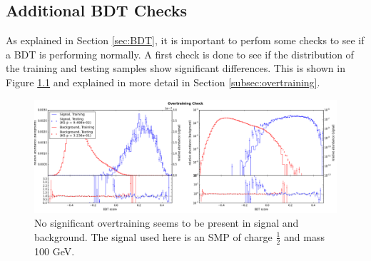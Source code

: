 \begin{appendices}
\usechapterimagefalse
{}
\chapter{Additional BDT Checks}
\label{ch:bdtchecks}
\usechapterimagetrue
As explained in Section \ref{sec:BDT}, it is important to perfom some checks to see if a BDT is performing normally. A first check is done to see if the distribution of the training and testing samples show significant differences. This is shown in Figure \ref{fig:overtraining} and explained in more detail in Section \ref{subsec:overtraining}.\\

\begin{figure}[ht]
\centering
\includegraphics[width=\textwidth]{appendix/img/overtrain.png}
\caption{No significant overtraining seems to be present in signal and background. The signal used here is an SMP of charge $\frac{1}{2}$ and mass 100 GeV.}
\label{fig:overtraining}
\end{figure}


\end{appendices}
